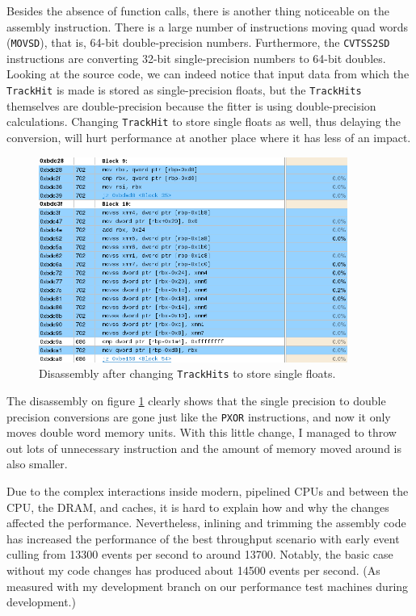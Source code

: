 \documentclass[12pt]{article}
\newcommand{\code}[1]{\texttt{#1}}
\begin{document}
Besides the absence of function calls, there is another thing noticeable on the assembly instruction. There is a large number of instructions moving quad words (\code{MOVSD}), that is, 64-bit double-precision numbers. Furthermore, the \code{CVTSS2SD} instructions are converting 32-bit single-precision numbers to 64-bit doubles. Looking at the source code, we can indeed notice that input data from which the \code{TrackHit} is made is stored as single-precision floats, but the \code{TrackHits} themselves are double-precision because the fitter is using double-precision calculations. Changing \code{TrackHit} to store single floats as well, thus delaying the conversion, will hurt performance at another place where it has less of an impact.

\begin{figure}[H]
	\begin{center}
		\includegraphics[width=0.9\textwidth]{kalmanfit_disasm_opt_asm_nocvt}
	\end{center}
	\caption{Disassembly after changing \code{TrackHits} to store single floats.}
	\label{fig_kalman_disasm_src_nocvt}
\end{figure}

The disassembly on figure \ref{fig_kalman_disasm_src_nocvt} clearly shows that the single precision to double precision conversions are gone just like the \code{PXOR} instructions, and now it only moves double word memory units. With this little change, I managed to throw out lots of unnecessary instruction and the amount of memory moved around is also smaller.

Due to the complex interactions inside modern, pipelined CPUs and between the CPU, the DRAM, and caches, it is hard to explain how and why the changes affected the performance. Nevertheless, inlining and trimming the assembly code has increased the performance of the best throughput scenario with early event culling from 13300 events per second to around 13700. Notably, the basic case without my code changes has produced about 14500 events per second. \small (As measured with my development branch on our performance test machines during development.) \normalsize
\end{document}
